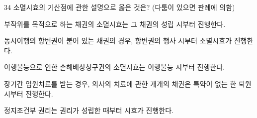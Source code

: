 \begin{question}{34}
소멸시효의 기산점에 관한 설명으로 옳은 것은? (다툼이 있으면 판례에 의함)
\begin{choices}
  \item 부작위를 목적으로 하는 채권의 소멸시효는 그 채권의 성립 시부터 진행한다.
  \item 동시이행의 항변권이 붙어 있는 채권의 경우, 항변권의 행사 시부터 소멸시효가 진행한다.
  \item 이행불능으로 인한 손해배상청구권의 소멸시효는 이행불능 시부터 진행한다.
  \item 장기간 입원치료를 받는 경우, 의사의 치료에 관한 개개의 채권은 특약이 없는 한 퇴원 시부터 진행한다.
  \item 정지조건부 권리는 권리가 성립한 때부터 시효가 진행한다.
\end{choices}
\end{question}
